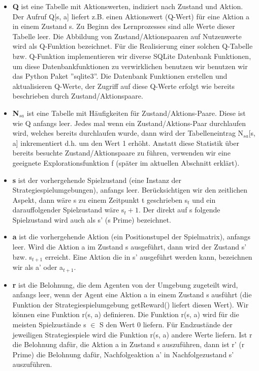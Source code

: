 \begin{itemize}
\item \textbf{Q} ist eine Tabelle mit Aktionswerten, indiziert nach Zustand und Aktion. Der Aufruf Q[s, a] liefert z.B. einen Aktionswert (Q-Wert) für eine Aktion a in einem Zustand s. Zu Beginn des Lernprozesses sind alle Werte dieser Tabelle leer. Die Abbildung von Zustand/Aktionspaaren auf Nutzenwerte wird als Q-Funktion bezeichnet. Für die Realisierung einer solchen Q-Tabelle bzw. Q-Funktion implementieren wir diverse SQLite Datenbank Funktionen, um diese Datenbankfunktionen zu verwirklichen benutzen wir benutzen wir das Python Paket ''sqlite3''. Die Datenbank Funktionen erstellen und aktualisieren Q-Werte, der Zugriff auf diese Q-Werte erfolgt wie bereits beschrieben durch Zustand/Aktionspaare.

\item \textbf{N$_{sa}$} ist eine Tabelle mit Häufigkeiten für Zustand/Aktions-Paare.  Diese ist wie Q anfangs leer. Jedes mal wenn ein Zustand/Aktions-Paar durchlaufen wird, welches bereits durchlaufen wurde, dann wird der Tabelleneintrag N$_{sa}$[s, a] inkrementiert d.h. um den Wert 1 erhöht. Anstatt diese Statistik über bereits besuchte Zustand/Aktionspaare zu führen, verwenden wir eine geeignete Explorationsfunktion f (später im aktuellen Abschnitt erklärt).

\item \textbf{s} ist der vorhergehende Spielzustand (eine Instanz der Strategiespielumgebungen), anfangs leer. Berücksichtigen wir den zeitlichen Aspekt, dann wäre s zu einem Zeitpunkt t geschrieben s${_t}$ und ein darauffolgender Spielzustand wäre s${_t+1}$. Der direkt auf s folgende Spielzustand wird auch als s' (s Prime) bezeichnet.

\item \textbf{a} ist die vorhergehende Aktion (ein Positionstupel der Spielmatrix), anfangs leer. Wird die Aktion a im Zustand s ausgeführt, dann wird der Zustand s' bzw. s$_{t+1}$ erreicht. Eine Aktion die in s' ausgeführt werden kann, bezeichnen wir als a' oder a$_{t+1}$.

\item \textbf{r} ist die Belohnung, die dem Agenten von der Umgebung zugeteilt wird, anfangs leer, wenn der Agent eine Aktion a in einem Zustand s ausführt (die Funktion der Strategiespielumgebung getReward() liefert diesen Wert). Wir können eine Funktion r(s, a) definieren. Die Funktion r(s, a) wird für die meisten Spielzustände s $\in$ S den Wert 0 liefern. Für Endzustände der jeweiligen Strategiespiele wird die Funktion r(s, a) andere Werte liefern. Ist r die Belohnung dafür, die Aktion a in Zustand s auszuführen, dann ist r' (r Prime) die Belohnung dafür, Nachfolgeaktion a' in Nachfolgezustand s' auszuführen.
\end{itemize}

